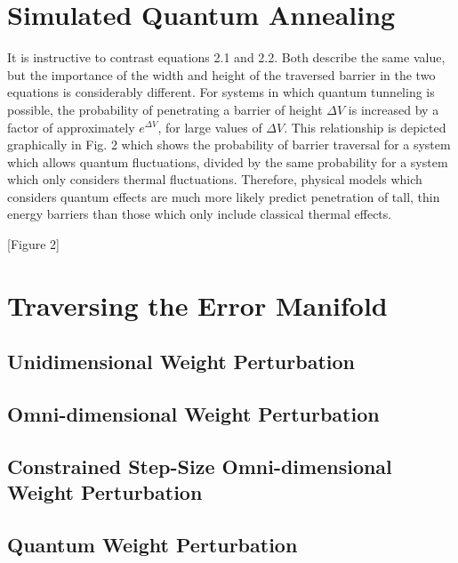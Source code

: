 \documentclass[11pt]{afthesis}
\begin{document}
\section{Simulated Quantum Annealing}

It is instructive to contrast equations 2.1 and 2.2. Both describe the same value, but the importance of the width and height of the traversed barrier in the two equations is considerably different. For systems in which quantum tunneling is possible, the probability of penetrating a barrier of height \begin{math} \Delta V \end{math} is increased by a factor of approximately \begin{math} e^{\Delta V} \end{math}, for large values of \begin{math} \Delta V \end{math}. This relationship is depicted graphically in Fig. 2 which shows the probability of barrier traversal for a system which allows quantum fluctuations, divided by the same probability for a system which only considers thermal fluctuations. Therefore, physical models which considers quantum effects are much more likely predict penetration of tall, thin energy barriers than those which only include classical thermal effects.


[Figure 2] 


\section{Traversing the Error Manifold}

\subsection{Unidimensional Weight Perturbation}

\subsection{Omni-dimensional Weight Perturbation}

\subsection{Constrained Step-Size Omni-dimensional Weight Perturbation}

\subsection{Quantum Weight Perturbation}
\end{document}
